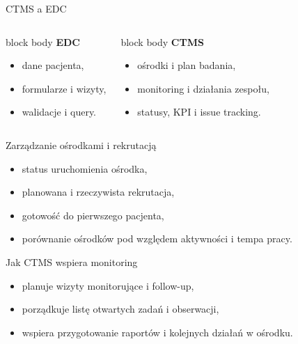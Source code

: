 \begin{frame}{CTMS a EDC}
  \begin{columns}[T,onlytextwidth]
    \begin{beamercolorbox}[wd=\linewidth,sep=0.8em,rounded=true]{block body}
      \textbf{\textcolor{UAFMTeal}{EDC}}\par\medskip
      \begin{itemize}
        \item dane pacjenta,
        \item formularze i wizyty,
        \item walidacje i query.
      \end{itemize}
    \end{beamercolorbox}

    \begin{beamercolorbox}[wd=\linewidth,sep=0.8em,rounded=true]{block body}
      \textbf{\textcolor{UAFMDarkBlue}{CTMS}}\par\medskip
      \begin{itemize}
        \item ośrodki i plan badania,
        \item monitoring i działania zespołu,
        \item statusy, KPI i issue tracking.
      \end{itemize}
    \end{beamercolorbox}
  \end{columns}
\end{frame}

\begin{frame}{Zarządzanie ośrodkami i rekrutacją}
  \begin{itemize}
    \item status uruchomienia ośrodka,
    \item planowana i rzeczywista rekrutacja,
    \item gotowość do pierwszego pacjenta,
    \item porównanie ośrodków pod względem aktywności i tempa pracy.
  \end{itemize}
\end{frame}

\begin{frame}{Jak CTMS wspiera monitoring}
  \begin{itemize}
    \item planuje wizyty monitorujące i follow-up,
    \item porządkuje listę otwartych zadań i obserwacji,
    \item wspiera przygotowanie raportów i kolejnych działań w ośrodku.
  \end{itemize}
\end{frame}

